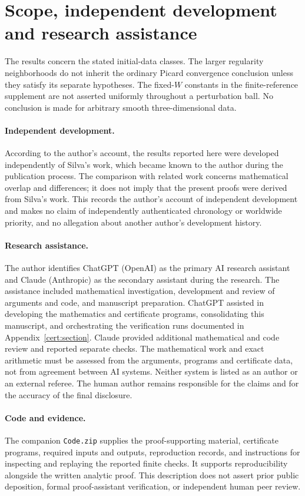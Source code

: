 \section{Scope, independent development and research assistance}
\label{disclosure:section}

The results concern the stated initial-data classes. The larger regularity
neighborhoods do not inherit the ordinary Picard convergence conclusion
unless they satisfy its separate hypotheses. The fixed-$W$ constants in
the finite-reference supplement are not asserted uniformly throughout a
perturbation ball. No conclusion is made for arbitrary smooth
three-dimensional data.

\paragraph{Independent development.}
According to the author's account, the results reported here were developed
independently of Silva's work, which became known to the author during the
publication process. The comparison with related work concerns mathematical
overlap and differences; it does not imply that the present proofs were
derived from Silva's work. This records the author's account of independent
development and makes no claim of independently authenticated chronology or
worldwide priority, and no allegation about another author's development
history.

\paragraph{Research assistance.}
The author identifies ChatGPT (OpenAI) as the primary AI research assistant
and Claude (Anthropic) as the secondary assistant during the research.
The assistance included mathematical investigation, development and review
of arguments and code, and manuscript preparation. ChatGPT assisted in
developing the mathematics and certificate programs, consolidating this
manuscript, and orchestrating the verification runs documented in
Appendix~\ref{cert:section}. Claude provided additional mathematical and
code review and reported separate checks. The mathematical work and exact
arithmetic must be assessed from the arguments, programs and certificate data, not
from agreement between AI systems. Neither system is listed as an author
or an external referee. The human author remains responsible for the
claims and for the accuracy of the final disclosure.

\paragraph{Code and evidence.}
The companion \nolinkurl{Code.zip} supplies the proof-supporting material,
certificate programs, required inputs and outputs, reproduction records,
and instructions for inspecting and replaying the reported finite checks.
It supports reproducibility alongside the written analytic proof. This
description does not assert prior public deposition, formal proof-assistant
verification, or independent human peer review.
